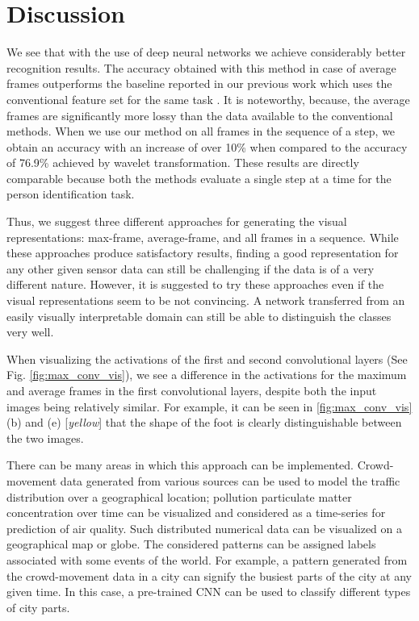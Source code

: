 \section{Discussion}
We see that with the use of deep neural networks we achieve considerably better recognition results. The accuracy obtained with this method in case of average frames outperforms the baseline reported in our previous work which uses the conventional feature set for the same task \cite{blind}. It is noteworthy, because, the average frames are significantly more lossy than the data available to the conventional methods. When we use our method on all frames in the sequence of a step, we obtain an accuracy with an increase of over 10\% when compared to the accuracy of 76.9\% achieved by wavelet transformation. These results are directly comparable because both the methods evaluate a single step at a time for the person identification task.

Thus, we suggest three different approaches for generating the visual representations: max-frame, average-frame, and all frames in a sequence. While these approaches produce satisfactory results, finding a good representation for any other given sensor data can still be challenging if the data is of a very different nature. However, it is suggested to try these approaches even if the visual representations seem to be not convincing. A network transferred from an easily visually interpretable domain can still be able to distinguish the classes very well.

When visualizing the activations of the first and second convolutional layers (See Fig. \ref{fig:max_conv_vis}), we see a difference in the activations for the maximum and average frames in the first convolutional layers, despite both the input images being relatively similar. For example, it can be seen in \ref{fig:max_conv_vis} (b) and (e) [\emph{yellow}] that the shape of the foot is clearly distinguishable between the two images.

There can be many areas in which this approach can be implemented. Crowd-movement data generated from various sources can be used to model the traffic distribution over a geographical location; pollution particulate matter concentration over time can be visualized and considered as a time-series for prediction of air quality. Such distributed numerical data can be visualized on a geographical map or globe. The considered patterns can be assigned labels associated with some events of the world. For example, a pattern generated from the crowd-movement data in a city can signify the busiest parts of the city at any given time. In this case, a pre-trained CNN can be used to classify different types of city parts.

